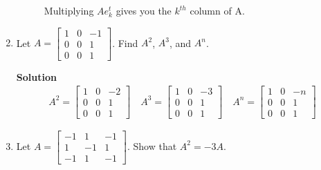 \begin{enumerate}
\begin{description}
\noindent Multiplying $Ae_{k}^{t}$ gives you the $k^{th}$
column of A.\\

\end{description}

\item Let $A=\left [ \begin{array}{rrr} 1&0&-1\\0&0&1\\0&0&1
\end{array} \right ]$. Find $A^2$, $A^3$, and $A^n$.

\noindent \textbf{Solution}
\begin{eqnarray*}
A^{2}=\left[ \begin{array}{rrr}
                       1&0&-2\\
                       0&0&1\\
                       0&0&1\end{array} \right] \quad
A^{3}=\left[ \begin{array}{rrr}
                       1&0&-3\\
                       0&0&1\\
                       0&0&1\end{array} \right] \quad
A^{n}=\left[ \begin{array}{rrr}
                       1&0&-n\\
                       0&0&1\\
                       0&0&1\end{array} \right]
\end{eqnarray*}

\item Let $A=\left [ \begin{array}{rrr} -1&1&-1\\ 1&-1&1\\ -1&1&-1
\end{array} \right ]$. Show that $A^2=-3A$.


\end{enumerate}
